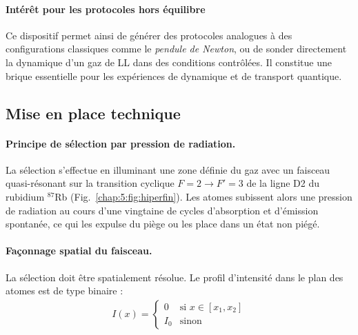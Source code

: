 \paragraph{Intérêt pour les protocoles hors équilibre}

Ce dispositif permet ainsi de générer des protocoles analogues à des configurations classiques comme le \emph{pendule de Newton}, ou de sonder directement la dynamique d’un gaz de \acrlong{LL} dans des conditions contrôlées. Il constitue une brique essentielle pour les expériences de dynamique et de transport quantique.


\subsection{Mise en place technique}


\paragraph{Principe de sélection par pression de radiation.}

La sélection s’effectue en illuminant une zone définie du gaz avec un faisceau quasi-résonant sur la transition cyclique \( F=2 \rightarrow F'=3 \) de la ligne D2 du rubidium $^{87}$Rb (Fig.~\ref{chap:5:fig:hiperfin}). Les atomes subissent alors une pression de radiation au cours d’une vingtaine de cycles d’absorption et d’émission spontanée, ce qui les expulse du piège ou les place dans un état non piégé.


\paragraph{Façonnage spatial du faisceau.}

La sélection doit être spatialement résolue. Le profil d’intensité dans le plan des atomes est de type binaire :
\begin{eqnarray*}
	I(x) = 
		\begin{cases}
			0 & \text{si } x \in [x_1, x_2] \\
			I_0 & \text{sinon}
		\end{cases}	
\end{eqnarray*}

